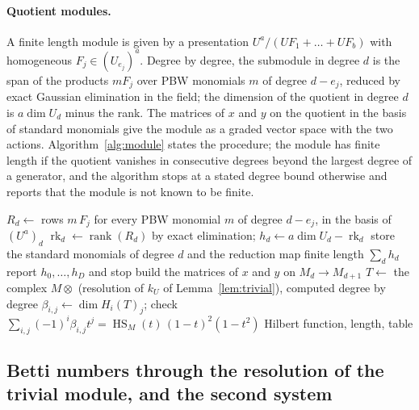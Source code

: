 \documentclass[11pt]{article}
\theoremstyle{definition}
\theoremstyle{remark}
\newcommand{\Q}{\mathbb{Q}}
\newcommand{\F}{\mathbb{F}}
\newcommand{\Hilb}{\operatorname{HS}}
\begin{document}
\paragraph{Quotient modules.} A finite length module is given by a presentation $U^a/(U F_1+\dots+U F_b)$ with homogeneous $F_j\in(U_{e_j})^a$. Degree by degree, the submodule in degree $d$ is the span of the products $mF_j$ over PBW monomials $m$ of degree $d-e_j$, reduced by exact Gaussian elimination in the field; the dimension of the quotient in degree $d$ is $a\dim U_d$ minus the rank. The matrices of $x$ and $y$ on the quotient in the basis of standard monomials give the module as a graded vector space with the two actions. Algorithm~\ref{alg:module} states the procedure; the module has finite length if the quotient vanishes in consecutive degrees beyond the largest degree of a generator, and the algorithm stops at a stated degree bound otherwise and reports that the module is not known to be finite.

\begin{algorithm}[htbp]
\caption{Quotient of $U^a$ by a left submodule and its Betti table. Input: a field $\Q$, $\F_p$ or $\F_{2^r}$, the generator degrees and the homogeneous relations $F_1,\dots,F_b$, a degree bound $D$. Output: the Hilbert function, the length if finite, the Betti table.}
\label{alg:module}
\begin{algorithmic}[1]
  \State $R_d\gets$ rows $m\,F_j$ for every PBW monomial $m$ of degree $d-e_j$, in the basis of $(U^a)_d$
  \State $\operatorname{rk}_d\gets\operatorname{rank}(R_d)$ by exact elimination; $h_d\gets a\dim U_d-\operatorname{rk}_d$
  \State store the standard monomials of degree $d$ and the reduction map
\EndFor
{}\State finite length $\sum_dh_d$\Else\State report $h_0,\dots,h_D$ and stop\EndIf
\State build the matrices of $x$ and $y$ on $M_d\to M_{d+1}$
\State $T\gets$ the complex $M\otimes$ (resolution of $k_U$ of Lemma~\ref{lem:trivial}), computed degree by degree
\State $\beta_{i,j}\gets\dim H_i(T)_j$; check $\sum_{i,j}(-1)^i\beta_{i,j}t^j=\Hilb_M(t)\,(1-t)^2(1-t^2)$
\State \Return Hilbert function, length, table
\end{algorithmic}
\end{algorithm}

\subsection{Betti numbers through the resolution of the trivial module, and the second system}
\label{sec:tor}
\end{document}
